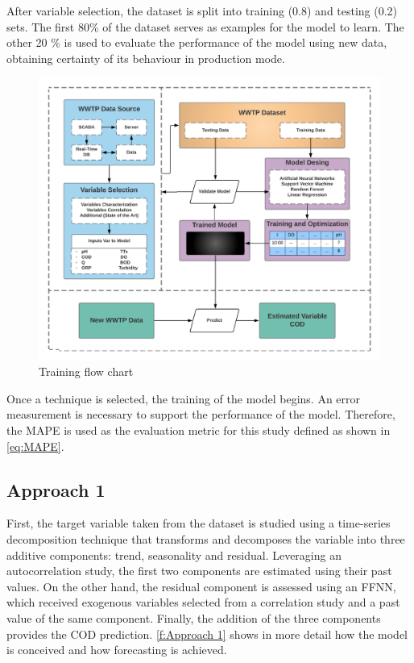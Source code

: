 After variable selection, the dataset is split into training (0.8) and testing (0.2) sets. The first 80\% of the dataset serves as examples for the model to learn. The other 20 \% is used to evaluate the performance of the model using new data, obtaining certainty of its behaviour in production mode. 

\begin{figure}[h]
\centering
\includegraphics[width=\linewidth]{figures/Ch4/training-FlowChart.pdf}
\caption{Training flow chart}
\label{f:training-flowchart}
\end{figure}

Once a technique is selected, the training of the model begins. An error measurement is necessary to support the performance of the model. Therefore, the \ac{MAPE} is used as the evaluation metric for this study defined as shown in \autoref{eq:MAPE}.

\subsection{Approach 1}
\label{s:Approach1}

First, the target variable taken from the dataset is studied using a time-series decomposition technique that transforms and decomposes the variable into three additive components: trend, seasonality and residual. Leveraging an autocorrelation study, the first two components are estimated using their past values. On the other hand, the residual component is assessed using an \ac{FFNN}, which received exogenous variables selected from a correlation study and a past value of the same component. Finally, the addition of the three components provides the \ac{COD} prediction. \autoref{f:Approach 1} shows in more detail how the model is conceived and how forecasting is achieved.

